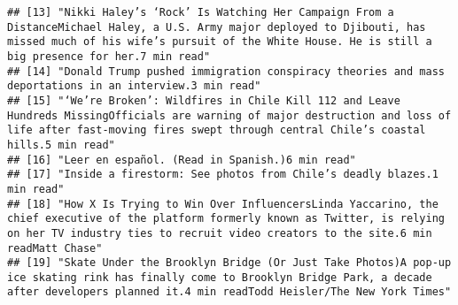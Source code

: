 \documentclass[
]{article}
\begin{document}
\begin{verbatim}
## [13] "Nikki Haley’s ‘Rock’ Is Watching Her Campaign From a DistanceMichael Haley, a U.S. Army major deployed to Djibouti, has missed much of his wife’s pursuit of the White House. He is still a big presence for her.7 min read"                                                                                                                                                                                          
## [14] "Donald Trump pushed immigration conspiracy theories and mass deportations in an interview.3 min read"                                                                                                                                                                                                                                                                                                                 
## [15] "‘We’re Broken’: Wildfires in Chile Kill 112 and Leave Hundreds MissingOfficials are warning of major destruction and loss of life after fast-moving fires swept through central Chile’s coastal hills.5 min read"                                                                                                                                                                                                     
## [16] "Leer en español. (Read in Spanish.)6 min read"                                                                                                                                                                                                                                                                                                                                                                        
## [17] "Inside a firestorm: See photos from Chile’s deadly blazes.1 min read"                                                                                                                                                                                                                                                                                                                                                 
## [18] "How X Is Trying to Win Over InfluencersLinda Yaccarino, the chief executive of the platform formerly known as Twitter, is relying on her TV industry ties to recruit video creators to the site.6 min readMatt Chase"                                                                                                                                                                                                 
## [19] "Skate Under the Brooklyn Bridge (Or Just Take Photos)A pop-up ice skating rink has finally come to Brooklyn Bridge Park, a decade after developers planned it.4 min readTodd Heisler/The New York Times"                                                                                                                                                                                                              

\end{verbatim}
\end{document}
